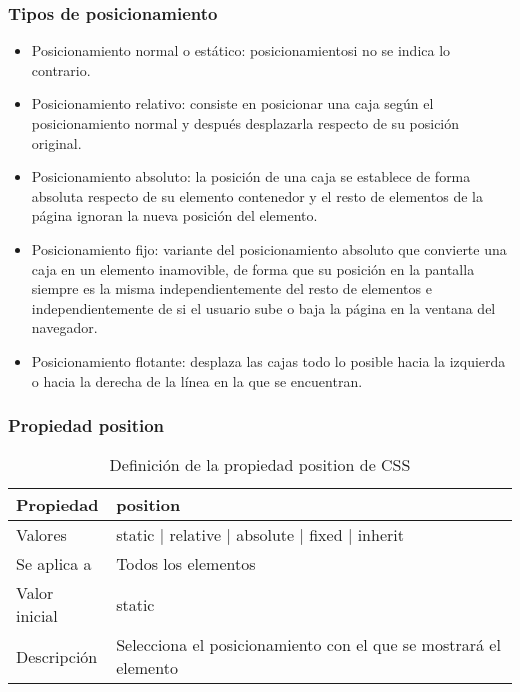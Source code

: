 
\begin{frame}
\frametitle{Tipos de posicionamiento}

\begin{itemize}
  \item Posicionamiento normal o estático: posicionamientosi no se indica lo contrario.
  \item Posicionamiento relativo: consiste en posicionar una caja según el posicionamiento normal y después desplazarla respecto de su posición original.
  \item Posicionamiento absoluto: la posición de una caja se establece de forma absoluta respecto de su elemento contenedor y el resto de elementos de la página ignoran la nueva posición del elemento.
  \item Posicionamiento fijo: variante del posicionamiento absoluto que convierte una caja en un elemento inamovible, de forma que su posición en la pantalla siempre es la misma independientemente del resto de elementos e independientemente de si el usuario sube o baja la página en la ventana del navegador.
  \item Posicionamiento flotante: desplaza las cajas todo lo posible hacia la izquierda o hacia la derecha de la línea en la que se encuentran.
\end{itemize}

\end{frame}



\begin{frame}
\frametitle{Propiedad position}

\begin{center}
  \begin{table}
   \begin{tabular}{p{1.8cm}p{7.8cm}}
Propiedad & \bf{position} \\ \hline
Valores& static | relative | absolute | fixed | inherit \\ \hline
Se aplica a& Todos los elementos \\ \hline
Valor inicial& static \\ \hline
Descripción& Selecciona el posicionamiento con el que se mostrará el elemento \\ \hline
  \end{tabular}
   \caption{Definición de la propiedad position de CSS}
 \end{table}
\end{center}


\end{frame}


